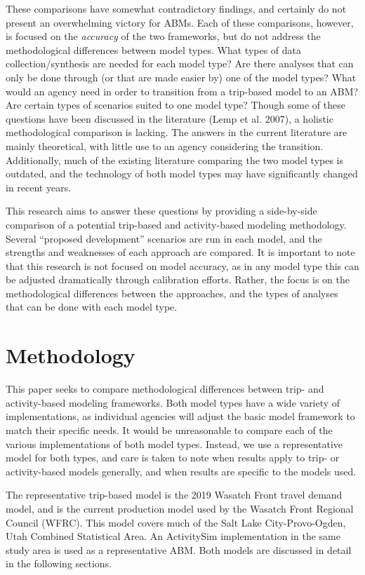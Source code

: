 \documentclass[fancy, twoside, mastersfancy, ms]{byuthesis}
\begin{document}
These comparisons have somewhat contradictory findings, and certainly do
not present an overwhelming victory for ABMs. Each of these comparisons,
however, is focused on the \emph{accuracy} of the two frameworks, but do
not address the methodological differences between model types. What
types of data collection/synthesis are needed for each model type? Are
there analyses that can only be done through (or that are made easier
by) one of the model types? What would an agency need in order to
transition from a trip-based model to an ABM? Are certain types of
scenarios suited to one model type? Though some of these questions have
been discussed in the literature (Lemp et al. 2007), a holistic
methodological comparison is lacking. The answers in the current
literature are mainly theoretical, with little use to an agency
considering the transition. Additionally, much of the existing
literature comparing the two model types is outdated, and the technology
of both model types may have significantly changed in recent years.

This research aims to answer these questions by providing a side-by-side
comparison of a potential trip-based and activity-based modeling
methodology. Several ``proposed development'' scenarios are run in each
model, and the strengths and weaknesses of each approach are compared.
It is important to note that this research is not focused on model
accuracy, as in any model type this can be adjusted dramatically through
calibration efforts. Rather, the focus is on the methodological
differences between the approaches, and the types of analyses that can
be done with each model type.


\chapter{Methodology}\label{sec-methods}

This paper seeks to compare methodological differences between trip- and
activity-based modeling frameworks. Both model types have a wide variety
of implementations, as individual agencies will adjust the basic model
framework to match their specific needs. It would be unreasonable to
compare each of the various implementations of both model types.
Instead, we use a representative model for both types, and care is taken
to note when results apply to trip- or activity-based models generally,
and when results are specific to the models used.

The representative trip-based model is the 2019 Wasatch Front travel
demand model, and is the current production model used by the Wasatch
Front Regional Council (WFRC). This model covers much of the Salt Lake
City-Provo-Ogden, Utah Combined Statistical Area. An ActivitySim
implementation in the same study area is used as a representative ABM.
Both models are discussed in detail in the following sections.
\end{document}
